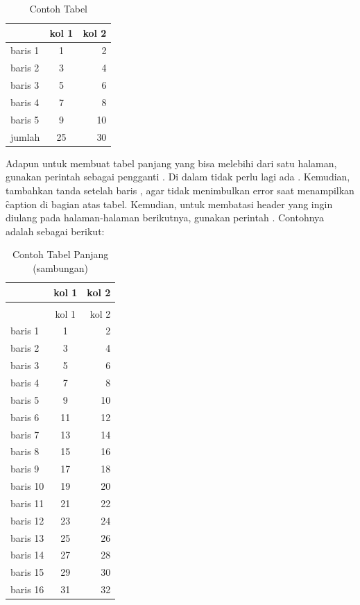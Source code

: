 \begin{table}
	\centering
	\caption{Contoh Tabel}
	\label{tab:tab1}
	\begin{tabular}{| l | c r |}
		\hline
		& kol 1 & kol 2 \\
		\hline
		baris 1 & 1 & 2 \\
		baris 2 & 3 & 4 \\
		baris 3 & 5 & 6 \\
		baris 4 & 7 & 8 \\
		baris 5 & 9 & 10 \\
		\hline
		jumlah  & 25 & 30 \\
		\hline
	\end{tabular}
\end{table}

Adapun untuk membuat tabel panjang yang bisa melebihi dari satu halaman, gunakan perintah  sebagai pengganti . Di dalam  tidak perlu lagi ada . Kemudian, tambahkan tanda \code{\bslash{}\bslash{}} setelah baris , agar tidak menimbulkan error saat menampilkan \f{caption} di bagian atas tabel. Kemudian, untuk membatasi header yang ingin diulang pada halaman-halaman berikutnya, gunakan perintah . Contohnya adalah sebagai berikut:

\begin{longtable}{| l | c r |}
\caption{Contoh Tabel Panjang}
\label{tab:tab2} \\
\hline
& kol 1 & kol 2 \\
\hline
\caption[]{Contoh Tabel Panjang (sambungan)} \\
\hline
& kol 1 & kol 2 \\
\hline
\hline
\hline
baris 1  & 1 & 2 \\
baris 2  & 3 & 4 \\
baris 3  & 5 & 6 \\
baris 4  & 7 & 8 \\
baris 5  & 9 & 10 \\
baris 6  & 11 & 12 \\
baris 7  & 13 & 14 \\
baris 8  & 15 & 16 \\
baris 9  & 17 & 18 \\
baris 10 & 19 & 20 \\
baris 11 & 21 & 22 \\
baris 12 & 23 & 24 \\
baris 13 & 25 & 26 \\
baris 14 & 27 & 28 \\
baris 15 & 29 & 30 \\
baris 16 & 31 & 32 \\
\end{longtable}

